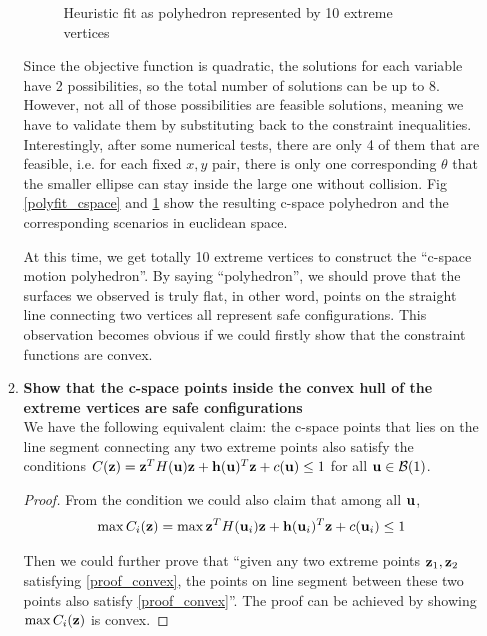 \documentclass{article}
\begin{document}
\begin{enumerate}
\begin{enumerate}
\begin{figure}[!b]
\begin{minipage}[b]{0.4\textwidth}
	\caption{Heuristic fit as polyhedron represented by 10 extreme vertices}
	\label{polyfit}
\end{minipage}
\end{figure}

Since the objective function is quadratic, the solutions for each variable have 2 possibilities, so the total number of solutions can be up to 8. However, not all of those possibilities are feasible solutions, meaning we have to validate them by substituting back to the constraint inequalities. Interestingly, after some numerical tests, there are only 4 of them that are feasible, i.e. for each fixed $x,y$ pair, there is only one corresponding $\theta$ that the smaller ellipse can stay inside the large one without collision. Fig \ref{polyfit_cspace} and \ref{polyfit} show the resulting c-space polyhedron and the corresponding scenarios in euclidean space.

At this time, we get totally 10 extreme vertices to construct the ``c-space motion polyhedron''. By saying ``polyhedron'', we should prove that the surfaces we observed is truly flat, in other word, points on the straight line connecting two vertices all represent safe configurations. This observation becomes obvious if we could firstly show that the constraint functions are convex.

\item {\bf Show that the c-space points inside the convex hull of the extreme vertices are safe configurations}\\
We have the following equivalent claim: the c-space points that lies on the line segment connecting any two extreme points also satisfy the conditions $C({\bf z}) = {\bf z}^T H({\bf u}) {\bf z} + {\bf h}({\bf u})^T {\bf z} + c({\bf u}) \leq 1$ for all ${\bf u} \in \mathcal{B}(1)$.

\begin{proof}
From the condition we could also claim that among all ${\bf u}$,
\begin{equation}
\label{proof_convex}
\max C_i({\bf z}) = \max {\bf z}^T H({\bf u}_i) {\bf z} + {\bf h}({\bf u}_i)^T {\bf z} + c({\bf u}_i) \leq 1
\end{equation}

Then we could further prove that ``given any two extreme points ${\bf z}_1, {\bf z}_2$ satisfying \eqref{proof_convex}, the points on line segment between these two points also satisfy \eqref{proof_convex}''. The proof can be achieved by showing $\max C_i({\bf z})$ is convex.


\end{proof}
\end{enumerate}
\end{enumerate}
\end{document}
